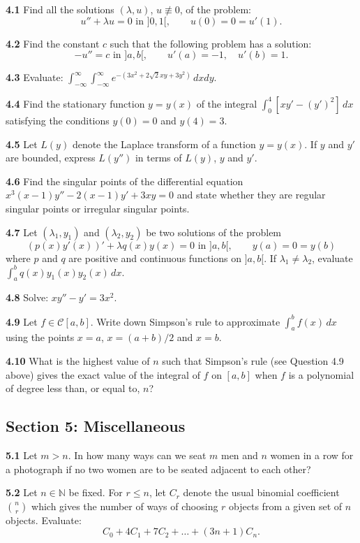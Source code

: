 \documentclass[11pt,a4paper]{article}
\newcommand{\N}{\mathbb{N}}
\newcommand{\examsec}[1]{%
  \subsection*{#1}
  \vspace{-2pt}
}
\newcommand{\qitem}[1]{\par\medskip\noindent\textbf{#1}\hspace{0.5em}}
\begin{document}
\qitem{4.1} Find all the solutions $(\lambda, u)$, $u \not\equiv 0$, of the problem:
\[
  u'' + \lambda u = 0 \text{ in } ]0, 1[,\qquad u(0) = 0 = u'(1).
\]

\qitem{4.2} Find the constant $c$ such that the following problem has a solution:
\[
  -u'' = c \text{ in } ]a, b[,\qquad u'(a) = -1,\quad u'(b) = 1.
\]

\qitem{4.3} Evaluate: $\displaystyle\int_{-\infty}^{\infty}\int_{-\infty}^{\infty} e^{-(3x^2 + 2\sqrt{2}xy + 3y^2)}\,dxdy$.

\qitem{4.4} Find the stationary function $y = y(x)$ of the integral $\int_0^4 [xy' - (y')^2]\,dx$ satisfying the conditions $y(0) = 0$ and $y(4) = 3$.

\qitem{4.5} Let $L(y)$ denote the Laplace transform of a function $y = y(x)$. If $y$ and $y'$ are bounded, express $L(y'')$ in terms of $L(y)$, $y$ and $y'$.

\qitem{4.6} Find the singular points of the differential equation $x^3(x - 1)y'' - 2(x - 1)y' + 3xy = 0$ and state whether they are regular singular points or irregular singular points.

\qitem{4.7} Let $(\lambda_1, y_1)$ and $(\lambda_2, y_2)$ be two solutions of the problem
\[
  (p(x)y'(x))' + \lambda q(x)y(x) = 0 \text{ in } ]a, b[,\qquad y(a) = 0 = y(b)
\]
where $p$ and $q$ are positive and continuous functions on $]a, b[$. If $\lambda_1 \neq \lambda_2$, evaluate $\int_a^b q(x)y_1(x)y_2(x)\,dx$.

\qitem{4.8} Solve: $xy'' - y' = 3x^2$.

\qitem{4.9} Let $f \in \mathcal{C}[a, b]$. Write down Simpson's rule to approximate $\int_a^b f(x)\,dx$ using the points $x = a$, $x = (a + b)/2$ and $x = b$.

\qitem{4.10} What is the highest value of $n$ such that Simpson's rule (see Question 4.9 above) gives the exact value of the integral of $f$ on $[a, b]$ when $f$ is a polynomial of degree less than, or equal to, $n$?

\examsec{Section 5: Miscellaneous}

\qitem{5.1} Let $m > n$. In how many ways can we seat $m$ men and $n$ women in a row for a photograph if no two women are to be seated adjacent to each other?

\qitem{5.2} Let $n \in \N$ be fixed. For $r \le n$, let $C_r$ denote the usual binomial coefficient $\binom{n}{r}$ which gives the number of ways of choosing $r$ objects from a given set of $n$ objects. Evaluate:
\[
  C_0 + 4C_1 + 7C_2 + \dots + (3n + 1)C_n.
\]
\end{document}
